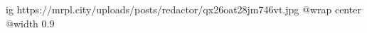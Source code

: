  
 
 
 
 

\ifcmt
  ig https://mrpl.city/uploads/posts/redactor/qx26oat28jm746vt.jpg
  @wrap center
  @width 0.9
\fi
